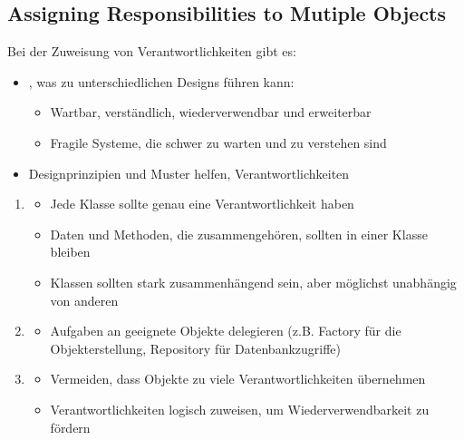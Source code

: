 \subsection{Assigning Responsibilities to Mutiple Objects}
\begin{infoBox}[title=Verantwortlichkeiten auf mehrere Objekte verteilen]
    Bei der Zuweisung von Verantwortlichkeiten gibt es:
    \begin{itemize}
        \item {}, was zu unterschiedlichen Designs führen kann:
        \begin{itemize}
            \item {} Wartbar, verständlich, wiederverwendbar und erweiterbar
            \item {} Fragile Systeme, die schwer zu warten und zu verstehen sind
        \end{itemize}
        \item Designprinzipien und Muster helfen, Verantwortlichkeiten 
    \end{itemize}
\end{infoBox}
\begin{infoBox}[title=Strategien für die Zuweisung von Verantwortlichkeiten]
    \begin{enumerate}
        \item {}
        \begin{itemize}
            \item {} Jede Klasse sollte genau eine Verantwortlichkeit haben
            \item {} Daten und Methoden, die zusammengehören, sollten in einer Klasse bleiben
            \item {} Klassen sollten stark zusammenhängend sein, aber möglichst unabhängig von anderen
        \end{itemize}
        \item {}
        \begin{itemize}
            \item Aufgaben an geeignete Objekte delegieren (z.B. Factory für die Objekterstellung, Repository für Datenbankzugriffe)
        \end{itemize}
        \item {}
        \begin{itemize}
            \item Vermeiden, dass Objekte zu viele Verantwortlichkeiten übernehmen
            \item Verantwortlichkeiten logisch zuweisen, um Wiederverwendbarkeit zu fördern
        \end{itemize}
    \end{enumerate}
\end{infoBox}
